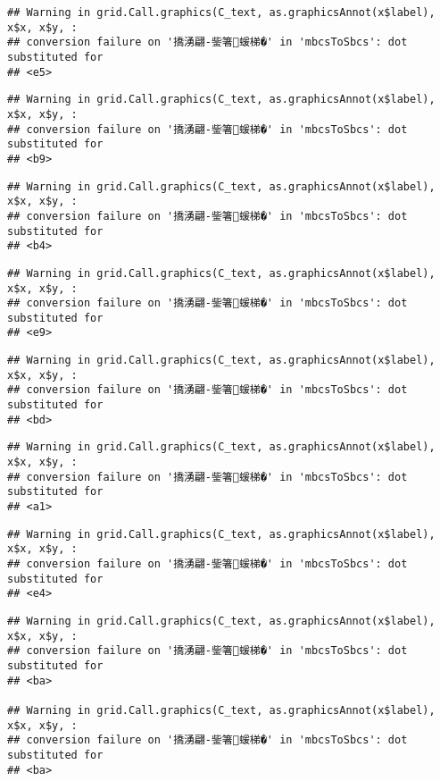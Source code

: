 \documentclass[
]{article}
\begin{document}
\begin{verbatim}
## Warning in grid.Call.graphics(C_text, as.graphicsAnnot(x$label), x$x, x$y, :
## conversion failure on '撟湧翩-鈭箸蝯梯�' in 'mbcsToSbcs': dot substituted for
## <e5>
\end{verbatim}

\begin{verbatim}
## Warning in grid.Call.graphics(C_text, as.graphicsAnnot(x$label), x$x, x$y, :
## conversion failure on '撟湧翩-鈭箸蝯梯�' in 'mbcsToSbcs': dot substituted for
## <b9>
\end{verbatim}

\begin{verbatim}
## Warning in grid.Call.graphics(C_text, as.graphicsAnnot(x$label), x$x, x$y, :
## conversion failure on '撟湧翩-鈭箸蝯梯�' in 'mbcsToSbcs': dot substituted for
## <b4>
\end{verbatim}

\begin{verbatim}
## Warning in grid.Call.graphics(C_text, as.graphicsAnnot(x$label), x$x, x$y, :
## conversion failure on '撟湧翩-鈭箸蝯梯�' in 'mbcsToSbcs': dot substituted for
## <e9>
\end{verbatim}

\begin{verbatim}
## Warning in grid.Call.graphics(C_text, as.graphicsAnnot(x$label), x$x, x$y, :
## conversion failure on '撟湧翩-鈭箸蝯梯�' in 'mbcsToSbcs': dot substituted for
## <bd>
\end{verbatim}

\begin{verbatim}
## Warning in grid.Call.graphics(C_text, as.graphicsAnnot(x$label), x$x, x$y, :
## conversion failure on '撟湧翩-鈭箸蝯梯�' in 'mbcsToSbcs': dot substituted for
## <a1>
\end{verbatim}

\begin{verbatim}
## Warning in grid.Call.graphics(C_text, as.graphicsAnnot(x$label), x$x, x$y, :
## conversion failure on '撟湧翩-鈭箸蝯梯�' in 'mbcsToSbcs': dot substituted for
## <e4>
\end{verbatim}

\begin{verbatim}
## Warning in grid.Call.graphics(C_text, as.graphicsAnnot(x$label), x$x, x$y, :
## conversion failure on '撟湧翩-鈭箸蝯梯�' in 'mbcsToSbcs': dot substituted for
## <ba>

## Warning in grid.Call.graphics(C_text, as.graphicsAnnot(x$label), x$x, x$y, :
## conversion failure on '撟湧翩-鈭箸蝯梯�' in 'mbcsToSbcs': dot substituted for
## <ba>
\end{verbatim}
\end{document}
